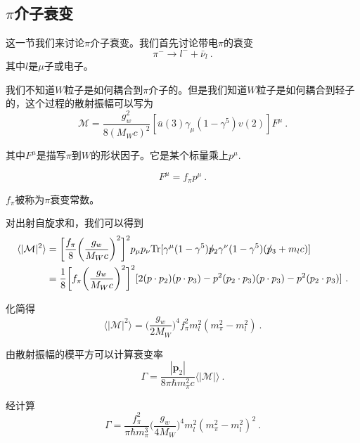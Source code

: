 



\subsection*{$\pi$介子衰变} 
这一节我们来讨论$\pi$介子衰变。我们首先讨论带电$\pi$的衰变 
\begin{equation}
\pi^- \rightarrow l^- + \bar \nu_l~.
\end{equation}
其中$l$是$\mu$子或电子。

我们不知道$W$粒子是如何耦合到$\pi$介子的。但是我们知道$W$粒子是如何耦合到轻子的，这个过程的散射振幅可以写为
\begin{equation}
\mathcal M = \frac{g_w^2}{8(M_W c)^2} [\bar u (3) \gamma_\mu (1-\gamma^5)v(2)] F^\mu~.
\end{equation}

其中$F^\mu$是描写$\pi$到$W$的形状因子。它是某个标量乘上$p^\mu$.

\begin{equation}
F^\mu = f_\pi p^\mu~. 
\end{equation}

$f_\pi$被称为$\pi$衰变常数。

对出射自旋求和，我们可以得到
\begin{equation}
\begin{aligned}
\langle |\mathcal M|^2 \rangle &= \bigg[ \frac{f_\pi}{8} \bigg( \frac{g_w}{M_W c} \bigg)^2  \bigg]^2 p_\mu p_\nu {\rm Tr} [\gamma^\mu (1-\gamma^5) p\!\!\!/_2\gamma^\nu (1-\gamma^5) (p\!\!\!/_3 + m_l c)   ] 
\\
& = \frac{1}{8} \bigg[ f_\pi \bigg( \frac{g_w}{M_W c} \bigg)^2 \bigg]^2 [2(p\cdot p_2)(p\cdot p_3) - p^2 (p_2\cdot p_3) (p\cdot p_3) - p^2 (p_2 \cdot p_3) ] ~.
\end{aligned}
\end{equation}

化简得
\begin{equation}
\langle |\mathcal M|^2 \rangle = \bigg( \frac{g_w}{2 M_W} \bigg)^4 f_\pi^2 m_l^2 (m_\pi^2 - m_l^2) ~.
\end{equation}

由散射振幅的模平方可以计算衰变率 
\begin{equation}
\Gamma = \frac{|\mathbf p_2|}{8\pi \hbar m_\pi^2 c} \langle | \mathcal M | \rangle ~.
\end{equation}

经计算
\begin{equation}
\Gamma = \frac{f_\pi^2}{\pi \hbar m_\pi^3} \bigg( \frac{g_w}{4 M_W} \bigg)^4 m_l^2 (m_\pi^2 - m_l^2)^2 ~.
\end{equation}

